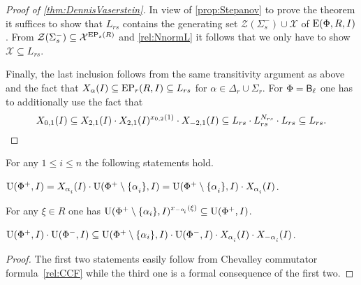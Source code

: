 \begin{proof}[Proof of \cref{thm:DennisVaserstein}]
In view of \cref{prop:Stepanov} to prove the theorem it suffices to show that $L_{rs}$ contains the generating set $\mathcal{Z}(\Sigma_s^-) \cup \mathcal{X}$ of $\operatorname{E}(\Phi, R, I)$.
From $\mathcal{Z}(\Sigma_s^-) \subseteq \mathcal{X}^{\operatorname{EP}_s(R)}$ and \eqref{rel:NnormL} it follows that we only have to show $\mathcal{X} \subseteq L_{rs}$.

Finally, the last inclusion follows from the same transitivity argument as above and the fact that $X_\alpha(I) \subseteq \operatorname{EP}_r(R, I) \subseteq L_{rs}$ for $\alpha \in \Delta_r \cup \Sigma_r$.
For $\Phi=\mathsf{B}_\ell$ one has to additionally use the fact that
$$X_{0,1}(I) \subseteq X_{2,1}(I) \cdot X_{2,1}(I)^{x_{0,2}(1)} \cdot X_{-2,1}(I) \subseteq L_{rs} \cdot L_{rs}^{N_{rs}} \cdot L_{rs} \subseteq L_{rs}. \qedhere$$ 
\end{proof}

\begin{lemma}\label{lemma:dv_unipotent} For any $1\leq i\leq n$ the following statements hold. 
\begin{thmlist} \item \label{item-dvu1} $\U(\Phi^+, I) = X_{\alpha\ssub{i}}(I)\cdot \U(\Phi^+\setminus\{\alpha\ssub{i}\}, I) = \U(\Phi^+\setminus\{\alpha\ssub{i}\}, I)\cdot X_{\alpha\ssub{i}}(I)$.
\item \label{item-dvu2} For any $\xi\in R$ one has $\U(\Phi^+\setminus\{\alpha_i\}, I)^{x_{-\alpha\ssub{i}}(\xi)} \subseteq \U(\Phi^+, I)$.
\item \label{item-dvu3} $\U(\Phi^+, I)\cdot \U(\Phi^-, I) \subseteq \U(\Phi^+\setminus \{\alpha_i\}, I) \cdot \U(\Phi^-, I) \cdot X_{\alpha\ssub{i}}(I) \cdot X_{-\alpha\ssub{i}}(I)$.
\end{thmlist} \end{lemma}
\begin{proof} The first two statements easily follow from Chevalley commutator formula~\eqref{rel:CCF} while the third one is a formal consequence of the first two. \end{proof}

